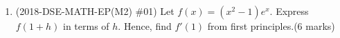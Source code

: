 \documentclass[12pt]{article}
\begin{document}
\begin{enumerate}
            \hrulefill
            
            \hrulefill
            
            \hrulefill
            
            \hrulefill
            
            \hrulefill

            \hrulefill
            
            \hrulefill
            
            \hrulefill
            
            \hrulefill
            
            \hrulefill
            
            \hrulefill
            
            \hrulefill
            
            \hrulefill
            
            \hrulefill
            
            \hrulefill
            
            \hrulefill
            
            \hrulefill
            
            \hrulefill
            
            \hrulefill
            
            \hrulefill
            
            \hrulefill
            
            \hrulefill
            
            \hrulefill
            
            \hrulefill
            
            \hrulefill
            
            \hrulefill
            
            \hrulefill
            
            \hrulefill
            
        \pagebreak
        \item (2018-DSE-MATH-EP(M2) \#01) Let $f(x)=(x^2-1)e^x$. Express $f(1+h)$ in terms of $h$. Hence, find $f'(1)$ from first principles.\hfill(6 marks)
        
        \hrulefill
            
            \hrulefill
            
            \hrulefill
            

\end{enumerate}
\end{document}
